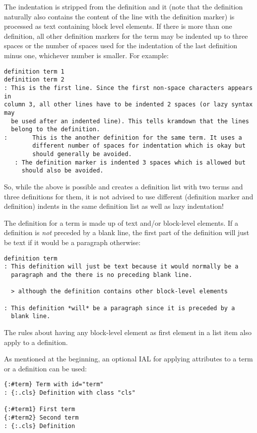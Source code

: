 \documentclass[a4paper]{article}
\begin{document}
The indentation is stripped from the definition and it (note that the
definition naturally also contains the content of the line with the
definition marker) is processed as text containing block level elements.
If there is more than one definition, all other definition markers for
the term may be indented up to three spaces or the number of spaces used
for the indentation of the last definition minus one, whichever number
is smaller. For example:

\begin{verbatim}
definition term 1
definition term 2
: This is the first line. Since the first non-space characters appears in
column 3, all other lines have to be indented 2 spaces (or lazy syntax may
  be used after an indented line). This tells kramdown that the lines
  belong to the definition.
:       This is the another definition for the same term. It uses a
        different number of spaces for indentation which is okay but
        should generally be avoided.
   : The definition marker is indented 3 spaces which is allowed but
     should also be avoided.
\end{verbatim}

So, while the above is possible and creates a definition list with two
terms and three definitions for them, it is not advised to use different
(definition marker and definition) indents in the same definition list
as well as lazy indentation!

The definition for a term is made up of text and/or block-level
elements. If a definition is \emph{not} preceded by a blank line, the
first part of the definition will just be text if it would be a
paragraph otherwise:

\begin{verbatim}
definition term
: This definition will just be text because it would normally be a
  paragraph and the there is no preceding blank line.

  > although the definition contains other block-level elements

: This definition *will* be a paragraph since it is preceded by a
  blank line.
\end{verbatim}

The rules about having any block-level element as first element in a
list item also apply to a definition.

As mentioned at the beginning, an optional IAL for applying attributes
to a term or a definition can be used:

\begin{verbatim}
{:#term} Term with id="term"
: {:.cls} Definition with class "cls"

{:#term1} First term
{:#term2} Second term
: {:.cls} Definition
\end{verbatim}
\end{document}
